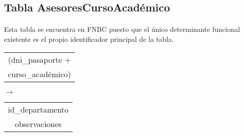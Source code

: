 \subsection{Tabla AsesoresCursoAcadémico}

  \paragraph{}Esta tabla se encuentra en FNBC puesto que el único
  determinante funcional existente es el propio identificador principal
  de la tabla.

 \begin{center}
    \begin{minipage}{4.2cm}{\begin{flushright}\begin{tabular}{ | c | }
                  \hline
                  (dni\_pasaporte + \\
                  curso\_académico) \\
                  \hline
                 \end{tabular}\end{flushright} }
    \end{minipage}
    \begin{minipage}{0.7cm}{$\longrightarrow$}
    \end{minipage}
    \begin{minipage}{5.9cm}{\begin{tabular}{ | c | }
                  \hline
                  id\_departamento \\
                  observaciones \\
                  \hline
                 \end{tabular} }
    \end{minipage}
  \end{center}

